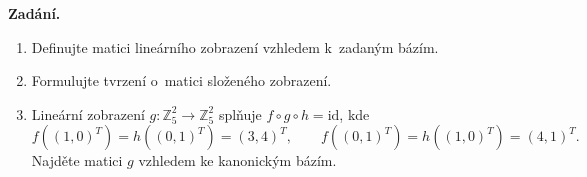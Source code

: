 \documentclass[11pt,a4paper]{article}
\begin{document}
\begin{priklad} \par
\textbf{Zadání.}
\begin{enumerate}[label=(\arabic*)]
  \item Definujte matici lineárního zobrazení vzhledem k~zadaným bázím.
  \item Formulujte tvrzení o~matici složeného zobrazení.
  \item Lineární zobrazení $g:\mathbb{Z}_5^2\to\mathbb{Z}_5^2$ splňuje $f\circ g\circ h=\mathrm{id}$, kde
    \[ f((1,0)^T)=h((0,1)^T)=(3,4)^T,\qquad f((0,1)^T)=h((1,0)^T)=(4,1)^T. \]
    Najděte matici $g$ vzhledem ke kanonickým bázím.
\end{enumerate}


\end{priklad}
\end{document}

